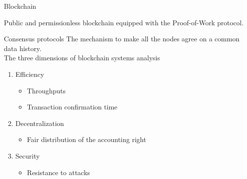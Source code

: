 \documentclass{beamer}
\begin{document}
\begin{frame}{Blockchain}
\vspace{0.2cm}
\begin{tcolorbox}[enhanced,drop shadow, title=Focus of the talk]
Public and permissionless blockchain equipped with the Proof-of-Work protocol.
\end{tcolorbox}
\end{frame}

\begin{frame}{Consensus protocols}
The mechanism to make all the nodes agree on a common data history.\\
\vspace{0.3cm}
The three dimensions of blockchain systems analysis
\begin{enumerate}
  \item Efficiency
  \begin{itemize}
    \item Throughputs
    \item Transaction confirmation time
  \end{itemize}
  \item Decentralization
  \begin{itemize}
    \item Fair distribution of the accounting right
  \end{itemize}
  \item Security 
  \begin{itemize}
    \item Resistance to attacks
  \end{itemize}
\end{enumerate}
\end{frame}
\end{document}
